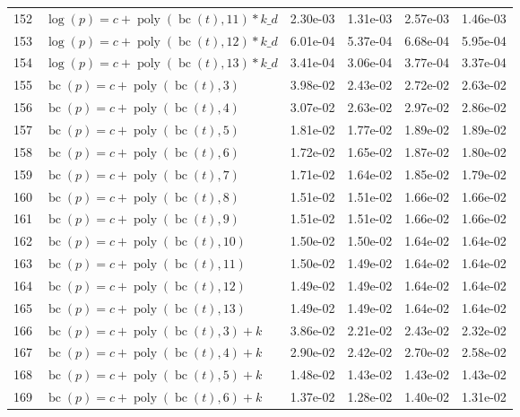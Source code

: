 \documentclass[12pt,a4paper]{article}
\DeclareMathOperator{\bc}{bc}
\DeclareMathOperator{\poly}{poly}
\begin{document}
\begin{longtable}[t]{ll>{\raggedleft\arraybackslash}p{2cm}>{\raggedleft\arraybackslash}p{2cm}>{\raggedleft\arraybackslash}p{2cm}>{\raggedleft\arraybackslash}p{2cm}}
152 & $\log(p) = c + \poly\left( \bc(t), 11 \right) * k\_d$ & 2.30e-03 & 1.31e-03 & 2.57e-03 & 1.46e-03\\
\rowcolor{gray!6}  153 & $\log(p) = c + \poly\left( \bc(t), 12 \right) * k\_d$ & 6.01e-04 & 5.37e-04 & 6.68e-04 & 5.95e-04\\
154 & $\log(p) = c + \poly\left( \bc(t), 13 \right) * k\_d$ & 3.41e-04 & 3.06e-04 & 3.77e-04 & 3.37e-04\\
\rowcolor{gray!6}  155 & $\bc(p) = c + \poly\left( \bc(t), 3 \right)$ & 3.98e-02 & 2.43e-02 & 2.72e-02 & 2.63e-02\\
156 & $\bc(p) = c + \poly\left( \bc(t), 4 \right)$ & 3.07e-02 & 2.63e-02 & 2.97e-02 & 2.86e-02\\
\rowcolor{gray!6}  157 & $\bc(p) = c + \poly\left( \bc(t), 5 \right)$ & 1.81e-02 & 1.77e-02 & 1.89e-02 & 1.89e-02\\
158 & $\bc(p) = c + \poly\left( \bc(t), 6 \right)$ & 1.72e-02 & 1.65e-02 & 1.87e-02 & 1.80e-02\\
\rowcolor{gray!6}  159 & $\bc(p) = c + \poly\left( \bc(t), 7 \right)$ & 1.71e-02 & 1.64e-02 & 1.85e-02 & 1.79e-02\\
160 & $\bc(p) = c + \poly\left( \bc(t), 8 \right)$ & 1.51e-02 & 1.51e-02 & 1.66e-02 & 1.66e-02\\
\rowcolor{gray!6}  161 & $\bc(p) = c + \poly\left( \bc(t), 9 \right)$ & 1.51e-02 & 1.51e-02 & 1.66e-02 & 1.66e-02\\
162 & $\bc(p) = c + \poly\left( \bc(t), 10 \right)$ & 1.50e-02 & 1.50e-02 & 1.64e-02 & 1.64e-02\\
\rowcolor{gray!6}  163 & $\bc(p) = c + \poly\left( \bc(t), 11 \right)$ & 1.50e-02 & 1.49e-02 & 1.64e-02 & 1.64e-02\\
164 & $\bc(p) = c + \poly\left( \bc(t), 12 \right)$ & 1.49e-02 & 1.49e-02 & 1.64e-02 & 1.64e-02\\
\rowcolor{gray!6}  165 & $\bc(p) = c + \poly\left( \bc(t), 13 \right)$ & 1.49e-02 & 1.49e-02 & 1.64e-02 & 1.64e-02\\
166 & $\bc(p) = c + \poly\left( \bc(t), 3 \right) + k$ & 3.86e-02 & 2.21e-02 & 2.43e-02 & 2.32e-02\\
\rowcolor{gray!6}  167 & $\bc(p) = c + \poly\left( \bc(t), 4 \right) + k$ & 2.90e-02 & 2.42e-02 & 2.70e-02 & 2.58e-02\\
168 & $\bc(p) = c + \poly\left( \bc(t), 5 \right) + k$ & 1.48e-02 & 1.43e-02 & 1.43e-02 & 1.43e-02\\
\rowcolor{gray!6}  169 & $\bc(p) = c + \poly\left( \bc(t), 6 \right) + k$ & 1.37e-02 & 1.28e-02 & 1.40e-02 & 1.31e-02\\

\end{longtable}
\end{document}
